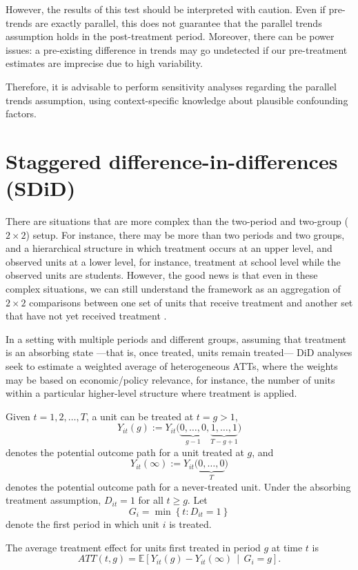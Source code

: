 However, the results of this test should be interpreted with caution. Even if pre-trends are exactly parallel, this does not guarantee that the parallel trends assumption holds in the post-treatment period. Moreover, there can be power issues: a pre-existing difference in trends may go undetected if our pre-treatment estimates are imprecise due to high variability.
  
Therefore, it is advisable to perform sensitivity analyses regarding the parallel trends assumption, using context-specific knowledge about plausible confounding factors.

\section{Staggered difference-in-differences (SDiD)}
There are situations that are more complex than the two-period and two-group ($2\times 2$) setup. For instance, there may be more than two periods and two groups, and a hierarchical structure in which treatment occurs at an upper level, and observed units at a lower level, for instance, treatment at school level while the observed units are students. However, the good news is that even in these complex situations, we can still understand the framework as an aggregation of $2\times 2$ comparisons between one set of units that receive treatment and another set that have not yet received treatment \cite{baker2025did_guide}.

In a setting with multiple periods and different groups, assuming that treatment is an absorbing state —that is, once treated, units remain treated— DiD analyses seek to estimate a weighted average of heterogeneous ATTs, where the weights may be based on economic/policy relevance, for instance, the number of units within a particular higher-level structure where treatment is applied. 

Given $t = 1, 2, \dots, T$, a unit can be treated at $t = g > 1$,  
\[
Y_{it}(g) := Y_{it}\big(\underbrace{0, \dots, 0}_{g-1}, \underbrace{1, \dots, 1}_{T-g+1}\big)
\]
denotes the potential outcome path for a unit treated at $g$, and
\[
Y_{it}(\infty) := Y_{it}\big(\underbrace{0, \dots, 0}_{T}\big)
\]
denotes the potential outcome path for a never-treated unit.  
Under the absorbing treatment assumption, $D_{it} = 1$ for all $t \geq g$. Let
\[
G_i = \min\left\{ t : D_{it} = 1 \right\}
\]
denote the first period in which unit $i$ is treated.

The average treatment effect for units first treated in period $g$ at time $t$ is
\[
ATT(t,g) = \mathbb{E}\left[ Y_{it}(g) - Y_{it}(\infty) \,\middle|\, G_i = g \right].
\]

